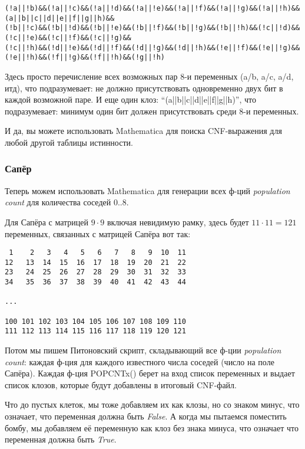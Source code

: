 \begin{lstlisting}
(!a||!b)&&(!a||!c)&&(!a||!d)&&(!a||!e)&&(!a||!f)&&(!a||!g)&&(!a||!h)&&(a||b||c||d||e||f||g||h)&&
(!b||!c)&&(!b||!d)&&(!b||!e)&&(!b||!f)&&(!b||!g)&&(!b||!h)&&(!c||!d)&&(!c||!e)&&(!c||!f)&&(!c||!g)&&
(!c||!h)&&(!d||!e)&&(!d||!f)&&(!d||!g)&&(!d||!h)&&(!e||!f)&&(!e||!g)&&(!e||!h)&&(!f||!g)&&(!f||!h)&&(!g||!h)
\end{lstlisting}

Здесь просто перечисление всех возможных пар 8-и переменных
(a/b, a/c, a/d, итд), что подразумевает: не должно присутствовать одновременно двух бит в каждой возможной паре.
И еще один клоз: ``(a||b||c||d||e||f||g||h)'', что подразумевает: минимум один бит должен присутствовать
среди 8-и переменных.

И да, вы можете использовать Mathematica для поиска \ac{CNF}-выражения для любой другой таблицы истинности.

\subsubsection{Сапёр}

Теперь можем использовать Mathematica для генерации всех ф-ций \textit{population count} для количества соседей 0..8.

Для Сапёра с матрицей $9 \cdot 9$ включая невидимую рамку, здесь будет $11 \cdot 11=121$ переменных,
связанных с матрицей Сапёра вот так:

\begin{lstlisting}
 1    2   3   4   5   6   7   8   9  10  11
12   13  14  15  16  17  18  19  20  21  22
23   24  25  26  27  28  29  30  31  32  33
34   35  36  37  38  39  40  41  42  43  44

...

100 101 102 103 104 105 106 107 108 109 110
111 112 113 114 115 116 117 118 119 120 121
\end{lstlisting}

Потом мы пишем Питоновский скрипт, складывающий все ф-ции \textit{population count}:
каждая ф-ция для каждого известного числа соседей (число на поле Сапёра).
Каждая ф-ция POPCNTx() берет на вход список переменных и выдает список клозов, которые будут добавлены
в итоговый \ac{CNF}-файл.

Что до пустых клеток, мы тоже добавляем их как клозы, но со знаком минус, что означает, что переменная
должна быть \textit{False}.
А когда мы пытаемся поместить бомбу, мы добавляем её переменную как клоз без знака минуса, что означает
что переменная должна быть \textit{True}.


